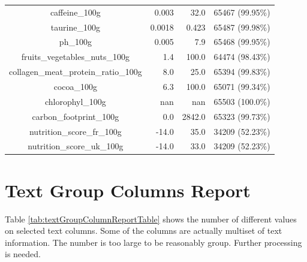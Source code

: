 \documentclass[11pt]{article}
\begin{document}
\begin{center}
\begin{longtable}{|c|r|r|r|}
caffeine\_100g& 0.003& 32.0& 65467 (99.95\%)\\
taurine\_100g& 0.0018& 0.423& 65487 (99.98\%)\\
ph\_100g& 0.005& 7.9& 65468 (99.95\%)\\
fruits\_vegetables\_nuts\_100g& 1.4& 100.0& 64474 (98.43\%)\\
collagen\_meat\_protein\_ratio\_100g& 8.0& 25.0& 65394 (99.83\%)\\
cocoa\_100g& 6.3& 100.0& 65071 (99.34\%)\\
chlorophyl\_100g& nan& nan& 65503 (100.0\%)\\
carbon\_footprint\_100g& 0.0& 2842.0& 65323 (99.73\%)\\
nutrition\_score\_fr\_100g& -14.0& 35.0& 34209 (52.23\%)\\
nutrition\_score\_uk\_100g& -14.0& 33.0& 34209 (52.23\%)\\

\hline

\end{longtable}
\end{center}


\section{Text Group Columns Report}
Table \ref{tab:textGroupColumnReportTable} shows the number of different values on selected text columns. Some of the columns are actually multiset of text information. The number is too large to be reasonably group. Further processing is needed.
\end{document}
